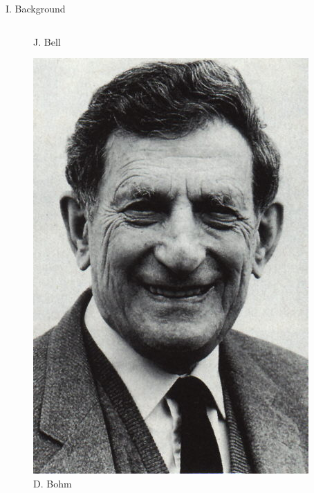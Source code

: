 \documentclass[final,hyperref={pdfpagelabels=false}]{beamer}
\begin{document}
\begin{frame}[t]
\begin{columns}[c]
\begin{column}{.31\textwidth}
\begin{block}{I. Background}
\begin{columns}
\begin{column}{0.3\textwidth}
\begin{figure}
              \caption{J. Bell}
            \end{figure}
            \begin{figure}
              \includegraphics[width=0.8\linewidth]{bohm}
              \caption{D. Bohm}
            \end{figure}
            \begin{figure}

\end{figure}
\end{column}
\end{columns}
\end{block}
\end{column}
\end{columns}
\end{frame}
\end{document}
